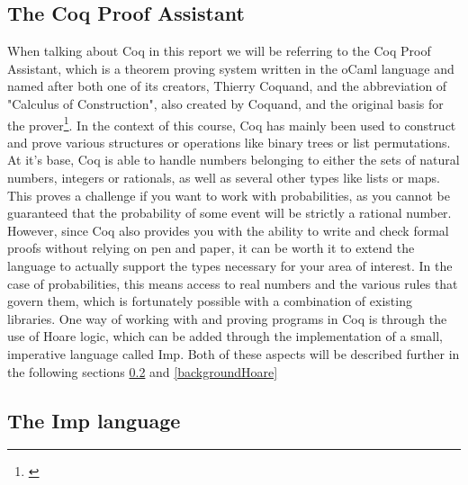 
\subsection{The Coq Proof Assistant}


When talking about Coq in this report we will be referring to the Coq Proof Assistant, which is a theorem proving system written in the oCaml language and named after both one of its creators, Thierry Coquand, and the abbreviation of "Calculus of Construction", also created by Coquand, and the original basis for the prover\footnote{\textcite{CoqIntro}}. In the context of this course, Coq has mainly been used to construct and prove various structures or operations like binary trees or list permutations. At it's base, Coq is able to handle numbers belonging to either the sets of natural numbers, integers or rationals, as well as several other types like lists or maps. This proves a challenge if you want to work with probabilities, as you cannot be guaranteed that the probability of some event will be strictly a rational number. However, since Coq also provides you with the ability to write and check formal proofs without relying on pen and paper, it can be worth it to extend the language to actually support the types necessary for your area of interest. 
In the case of probabilities, this means access to real numbers and the various rules that govern them, which is fortunately possible with a combination of existing libraries. One way of working with and proving programs in Coq is through the use of Hoare logic, which can be added through the implementation of a small, imperative language called Imp. Both of these aspects will be described further in the following sections \ref{backgroundImp} and \ref{backgroundHoare} 



\subsection{The Imp language}\label{backgroundImp}

